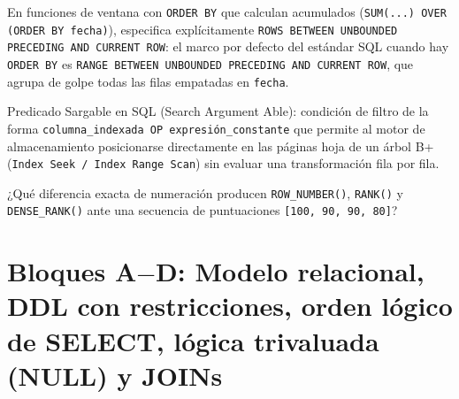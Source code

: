 \documentclass{book}
\begin{document}
\begin{tcolorbox}[title={Consejo}, studiumtip, breakable]

En funciones de ventana con \texttt{ORDER BY} que calculan acumulados (\texttt{SUM(...) OVER (ORDER BY fecha)}), especifica explícitamente \texttt{ROWS BETWEEN UNBOUNDED PRECEDING AND CURRENT ROW}: el marco por defecto del estándar SQL cuando hay \texttt{ORDER BY} es \texttt{RANGE BETWEEN UNBOUNDED PRECEDING AND CURRENT ROW}, que agrupa de golpe todas las filas empatadas en \texttt{fecha}.
\end{tcolorbox}

\begin{tcolorbox}[title={Definición}, studiumdef, breakable]

Predicado Sargable en SQL (Search Argument Able): condición de filtro de la forma \texttt{columna\_indexada OP expresi{\'o}n\_constante} que permite al motor de almacenamiento posicionarse directamente en las páginas hoja de un árbol B+ (\texttt{Index Seek / Index Range Scan}) sin evaluar una transformación fila por fila.
\end{tcolorbox}

\begin{tcolorbox}[title={Autoficha}, studiumcheck, breakable]

¿Qué diferencia exacta de numeración producen \texttt{ROW\_NUMBER()}, \texttt{RANK()} y \texttt{DENSE\_RANK()} ante una secuencia de puntuaciones \texttt{[100, 90, 90, 80]}?
\end{tcolorbox}

\section{Bloques A\(-\)D: Modelo relacional, DDL con restricciones, orden lógico de SELECT, lógica trivaluada (NULL) y JOINs}
\end{document}
